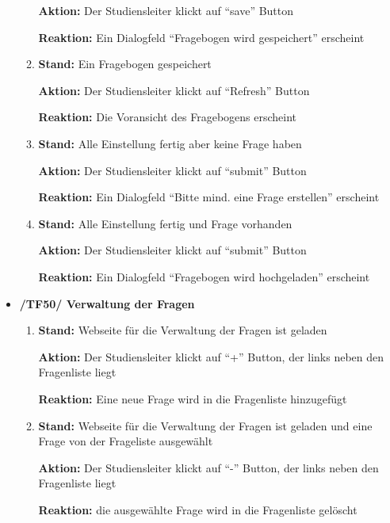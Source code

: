 \documentclass[a4paper]{scrreprt}
\begin{document}
\begin{itemize}
\begin{enumerate}
                              \par \textbf{Aktion: }Der \gls{Studiensleiter} klickt auf ``save'' Button
                              \par \textbf{Reaktion: }Ein Dialogfeld ``Fragebogen wird gespeichert'' erscheint
                        \item \par \textbf{Stand: }Ein Fragebogen gespeichert
                              \par \textbf{Aktion: }Der \gls{Studiensleiter} klickt auf ``Refresh'' Button
                              \par \textbf{Reaktion: }Die Voransicht des Fragebogens erscheint
                        \item \par \textbf{Stand: }Alle Einstellung fertig aber keine Frage haben
                              \par \textbf{Aktion: }Der \gls{Studiensleiter} klickt auf ``submit'' Button
                              \par \textbf{Reaktion: }Ein Dialogfeld ``Bitte mind. eine Frage erstellen'' erscheint
                        \item \par \textbf{Stand: }Alle Einstellung fertig und Frage vorhanden
                              \par \textbf{Aktion: }Der \gls{Studiensleiter} klickt auf ``submit'' Button
                              \par \textbf{Reaktion: }Ein Dialogfeld ``Fragebogen wird hochgeladen'' erscheint
                    \end{enumerate}

                \item \textbf{/TF50/ Verwaltung der Fragen}
                        \begin{enumerate}
                        \item \par \textbf{Stand: } Webseite für die Verwaltung der Fragen ist geladen
                              \par \textbf{Aktion: } Der \gls{Studiensleiter} klickt auf ``+'' Button, der links neben den Fragenliste liegt
                              \par \textbf{Reaktion: } Eine neue Frage wird in die Fragenliste hinzugefügt
                              
                        \item \par \textbf{Stand: } Webseite für die Verwaltung der Fragen ist geladen und eine Frage von der Frageliste ausgewählt
                              \par \textbf{Aktion: }  Der \gls{Studiensleiter} klickt auf ``-'' Button, der links neben den Fragenliste liegt 
                              \par \textbf{Reaktion: } die ausgewählte Frage wird in die Fragenliste gelöscht


\end{enumerate}
\end{itemize}
\end{document}
